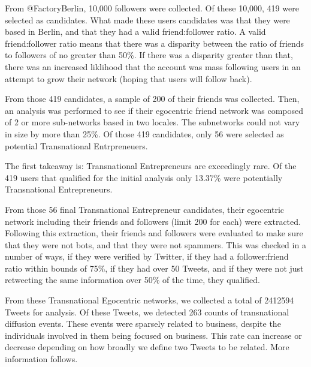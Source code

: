 From @FactoryBerlin, 10,000 followers were collected. Of these 10,000,
419 were selected as candidates. What made these users candidates was
that they were based in Berlin, and that they had a valid
friend:follower ratio. A valid friend:follower ratio means that there
was a disparity between the ratio of friends to followers of no
greater than 50\%. If there was a disparity greater than that, there
was an increased liklihood that the account was mass following users
in an attempt to grow their network (hoping that users will follow
back).

From those 419 candidates, a sample of 200 of their friends was
collected. Then, an analysis was performed to see if their egocentric
friend network was composed of 2 or more sub-networks based in two
locales.  The subnetworks could not vary in size by more than 25\%. Of
those 419 candidates, only 56 were selected as potential Transnational
Entrpreneuers.

The first takeaway is: Transnational Entrepreneurs are exceedingly
rare. Of the 419 users that qualified for the initial analysis only
13.37\% were potentially Transnational Entrepreneurs.

From those 56 final Transnational Entrepreneur candidates, their
egocentric network including their friends and followers (limit 200
for each) were extracted. Following this extraction, their friends and
followers were evaluated to make sure that they were not bots, and that
they were not spammers. This was checked in a number of ways, if they
were verified by Twitter, if they had a follower:friend ratio within
bounds of 75\%, if they had over 50 Tweets, and if they were not just
retweeting the same information over 50\% of the time, they qualified.

From these Transnational Egocentric networks, we collected a total of
2412594 Tweets for analysis. Of these Tweets, we detected 263 counts
of transnational diffusion events. These events were sparsely related
to business, despite the individuals involved in them being focused on
business. This rate can increase or decrease depending on how broadly
we define two Tweets to be related. More information follows.

